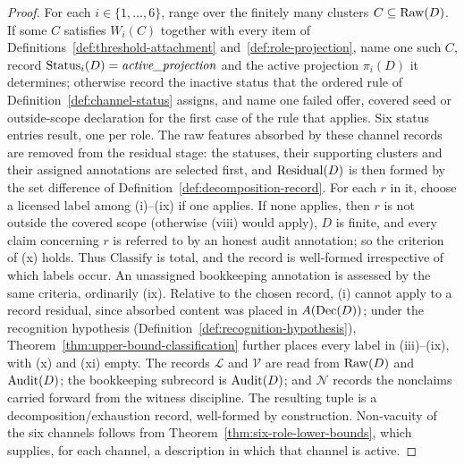 \begin{proof}
For each \(i \in \{1,\ldots,6\}\), range over the finitely many clusters
\(C\subseteq\operatorname{Raw}\!\left(D\right)\). If some \(C\) satisfies \(W_i(C)\) together with every
item of Definitions~\ref{def:threshold-attachment}
and~\ref{def:role-projection}, name one such \(C\), record
\(\operatorname{Status}_{i}\!\left(D\right) = \textit{active\_\allowbreak projection}\) and the active projection
\(\pi_i(D)\) it determines; otherwise record the inactive status that the
ordered rule of Definition~\ref{def:channel-status} assigns, and name one
failed offer, covered seed or outside-scope declaration for the first case of
the rule that applies. Six status entries
result, one per role. The raw features absorbed by these channel
records are removed from the residual stage: the statuses, their
supporting clusters and their assigned annotations are selected first, and
\(\operatorname{Residual}\!\left(D\right)\) is then formed by the set difference of
Definition~\ref{def:decomposition-record}. For each \(r\) in it, choose a
licensed label among (i)--(ix) if one applies. If none applies, then \(r\) is
not outside the covered scope (otherwise (viii) would apply), \(D\) is finite,
and every claim concerning \(r\) is referred to by an honest audit annotation; so the criterion of
(x) holds. Thus \(\mathrm{Classify}\) is total, and the record is well-formed
irrespective of which labels occur. An unassigned bookkeeping annotation is
assessed by the same criteria, ordinarily (ix). Relative to the chosen
record, (i) cannot apply to a record residual, since absorbed content was
placed in \(A(\operatorname{Dec}\!\left(D\right))\); under the recognition hypothesis
(Definition~\ref{def:recognition-hypothesis}),
Theorem~\ref{thm:upper-bound-classification} further places every label in
(iii)--(ix), with (x) and (xi) empty. The records \(\mathcal{L}\) and \(\mathcal{V}\) are
read from \(\operatorname{Raw}\!\left(D\right)\) and \(\operatorname{Audit}\!\left(D\right)\); the bookkeeping subrecord is
\(\operatorname{Audit}\!\left(D\right)\); and \(\mathcal{N}\) records the nonclaims carried
forward from the witness discipline. The resulting tuple is a
decomposition/exhaustion record, well-formed by construction.
Non-vacuity of the six channels follows from
Theorem~\ref{thm:six-role-lower-bounds}, which supplies, for each
channel, a description in which that channel is active.
\end{proof}

